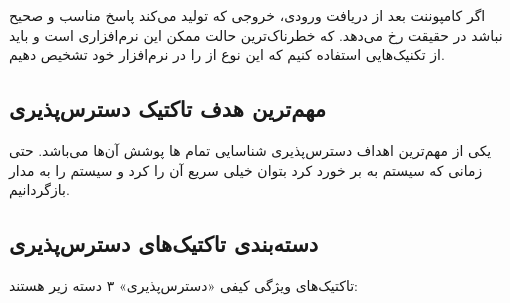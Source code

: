 اگر کامپوننت بعد از دریافت ورودی، خروجی که تولید می‌کند پاسخ مناسب و صحیح نباشد
در حقیقت  رخ می‌دهد. که خطرناک‌ترین حالت ممکن این 
نرم‌افزاری است و باید از تکنیک‌هایی استفاده کنیم که این نوع از  را در
نرم‌افزار خود تشخیص دهیم.

\subsection{مهم‌ترین هدف تاکتیک دسترس‌پذیری}

یکی از مهم‌ترین اهداف دسترس‌پذیری شناسایی تمام ها پوشش آن‌ها می‌باشد.
حتی زمانی که سیستم به  بر خورد کرد بتوان خیلی سریع آن را 
کرد و سیستم را به مدار بازگردانیم.

\subsection{دسته‌بندی تاکتیک‌های دسترس‌پذیری}

تاکتیک‌های ویژگی کیفی «دسترس‌پذیری» ۳ دسته زیر هستند:

\subsubsection{}

